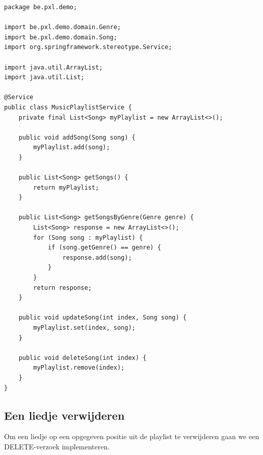 \begin{lstlisting}
package be.pxl.demo;

import be.pxl.demo.domain.Genre;
import be.pxl.demo.domain.Song;
import org.springframework.stereotype.Service;

import java.util.ArrayList;
import java.util.List;

@Service
public class MusicPlaylistService {
	private final List<Song> myPlaylist = new ArrayList<>();

	public void addSong(Song song) {
		myPlaylist.add(song);
	}

	public List<Song> getSongs() {
		return myPlaylist;
	}

	public List<Song> getSongsByGenre(Genre genre) {
		List<Song> response = new ArrayList<>();
		for (Song song : myPlaylist) {
			if (song.getGenre() == genre) {
				response.add(song);
			}
		}
		return response;
	}

	public void updateSong(int index, Song song) {
		myPlaylist.set(index, song);
	}

	public void deleteSong(int index) {
		myPlaylist.remove(index);
	}
}
\end{lstlisting}

\subsection{Een liedje verwijderen}

Om een liedje op een opgegeven positie uit de playlist te verwijderen gaan we een DELETE-verzoek implementeren.


